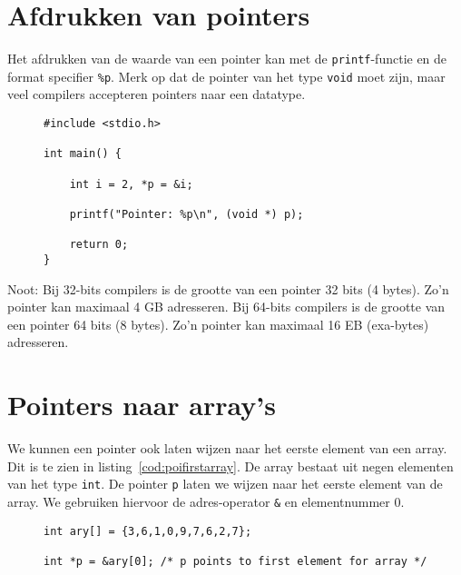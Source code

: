 \section{Afdrukken van pointers}
\label{sec:afdrukkenvanpointers}
Het afdrukken van de waarde van een pointer kan met de \texttt{printf}-functie en de format specifier \texttt{\%p}. Merk op dat de pointer van het type \texttt{void} moet zijn, maar veel compilers accepteren pointers naar een datatype.

\begin{figure}[!ht]
\begin{lstlisting}[caption=Afdrukken van een pointer.]
#include <stdio.h>

int main() {

    int i = 2, *p = &i;

    printf("Pointer: %p\n", (void *) p);

    return 0;
}
\end{lstlisting}
\end{figure}

Noot: Bij 32-bits compilers is de grootte van een pointer 32 bits (4 bytes). Zo'n pointer kan maximaal 4 GB adresseren. Bij 64-bits compilers is de grootte van een pointer 64 bits (8 bytes). Zo'n pointer kan maximaal 16 EB (exa-bytes) adresseren.


\section{Pointers naar array's}
\label{sec:pointersnaararrays}
We kunnen een pointer ook laten wijzen naar het eerste element van een array. Dit is te zien in listing~\ref{cod:poifirstarray}. De array bestaat uit negen elementen van het type \texttt{int}. De pointer \texttt{p} laten we wijzen naar het eerste element van de array. We gebruiken hiervoor de adres-operator \texttt{\&} en elementnummer 0.

\begin{figure}[!ht]
\begin{lstlisting}[caption=Een pointer naar het eerste element van een array.,label=cod:poifirstarray]
int ary[] = {3,6,1,0,9,7,6,2,7};

int *p = &ary[0]; /* p points to first element for array */
\end{lstlisting}
\end{figure}

